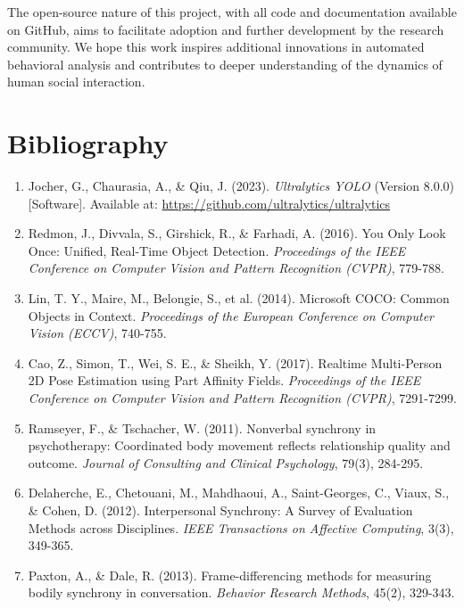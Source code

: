 \documentclass[11pt]{article}
\begin{document}
The open-source nature of this project, with all code and documentation available on GitHub, aims to facilitate adoption and further development by the research community. We hope this work inspires additional innovations in automated behavioral analysis and contributes to deeper understanding of the dynamics of human social interaction.

\section{Bibliography}

\begin{enumerate}
    \item Jocher, G., Chaurasia, A., \& Qiu, J. (2023). \textit{Ultralytics YOLO} (Version 8.0.0) [Software]. Available at: \url{https://github.com/ultralytics/ultralytics}
    
    \item Redmon, J., Divvala, S., Girshick, R., \& Farhadi, A. (2016). You Only Look Once: Unified, Real-Time Object Detection. \textit{Proceedings of the IEEE Conference on Computer Vision and Pattern Recognition (CVPR)}, 779-788.
    
    \item Lin, T. Y., Maire, M., Belongie, S., et al. (2014). Microsoft COCO: Common Objects in Context. \textit{Proceedings of the European Conference on Computer Vision (ECCV)}, 740-755.
    
    \item Cao, Z., Simon, T., Wei, S. E., \& Sheikh, Y. (2017). Realtime Multi-Person 2D Pose Estimation using Part Affinity Fields. \textit{Proceedings of the IEEE Conference on Computer Vision and Pattern Recognition (CVPR)}, 7291-7299.
    
    \item Ramseyer, F., \& Tschacher, W. (2011). Nonverbal synchrony in psychotherapy: Coordinated body movement reflects relationship quality and outcome. \textit{Journal of Consulting and Clinical Psychology}, 79(3), 284-295.
    
    \item Delaherche, E., Chetouani, M., Mahdhaoui, A., Saint-Georges, C., Viaux, S., \& Cohen, D. (2012). Interpersonal Synchrony: A Survey of Evaluation Methods across Disciplines. \textit{IEEE Transactions on Affective Computing}, 3(3), 349-365.
    
    \item Paxton, A., \& Dale, R. (2013). Frame-differencing methods for measuring bodily synchrony in conversation. \textit{Behavior Research Methods}, 45(2), 329-343.
    

\end{enumerate}
\end{document}
